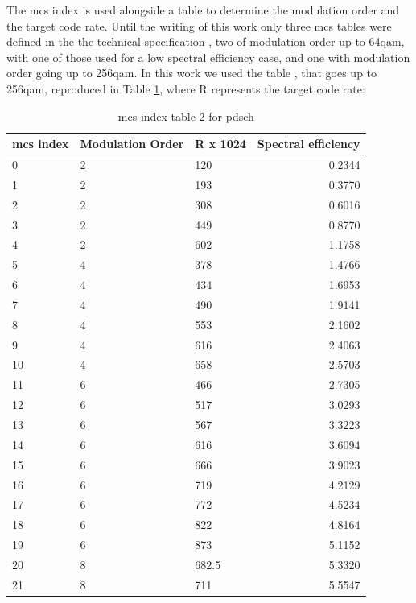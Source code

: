 The \gls{mcs} index is used alongside a table to determine the modulation order and the target code rate.
%
Until the writing of this work only three \gls{mcs} tables were defined in the the technical specification \cite{3gpp.38.214}, two of modulation order up to 64\gls{qam}, with one of those used for a low spectral efficiency case, and one with modulation order going up to 256\gls{qam}.
%
In this work we used the table \cite[Table 5.1.3.1-2]{3gpp.38.214}, that goes up to 256\gls{qam}, reproduced in Table \ref{tab:mcs-table}, where R represents the target code rate:

\begin{table}[tb]
\centering
\caption{\gls{mcs} index table 2 for \gls{pdsch}}
\label{tab:mcs-table}
\begin{tabularx}{0.85\columnwidth}{l X X r}
  \toprule
  \gls{mcs} index  & Modulation Order & R x 1024  &  Spectral efficiency \\
  \midrule
  0  &  2   & 120       &  0.2344 \\
  1  &  2   & 193       &  0.3770 \\
  2  &  2   & 308       &  0.6016 \\
  3  &  2   & 449       &  0.8770 \\
  4  &  2   & 602       &  1.1758 \\
  5  &  4   & 378       &  1.4766 \\
  6  &  4   & 434       &  1.6953 \\
  7  &  4   & 490       &  1.9141 \\
  8  &  4   & 553       &  2.1602 \\
  9  &  4   & 616       &  2.4063 \\
  10 &  4   & 658       &  2.5703 \\
  11 &  6   & 466       &  2.7305 \\
  12 &  6   & 517       &  3.0293 \\
  13 &  6   & 567       &  3.3223 \\
  14 &  6   & 616       &  3.6094 \\
  15 &  6   & 666       &  3.9023 \\
  16 &  6   & 719       &  4.2129 \\
  17 &  6   & 772       &  4.5234 \\
  18 &  6   & 822       &  4.8164 \\
  19 &  6   & 873       &  5.1152 \\
  20 &  8   & 682.5     &  5.3320 \\
  21 &  8   & 711       &  5.5547 \\

\end{tabularx}
\end{table}
